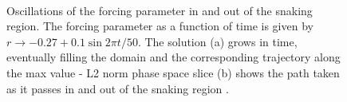 \documentclass[pre,preprint,superscriptaddress]{revtex4-1}
\begin{document}
\begin{figure}[h]
  \begin{center}
    \mbox{
       \quad
      }
    \caption{Oscillations of the forcing parameter in and out of the snaking region.  The forcing parameter as a function of time is given by $r\rightarrow -0.27+ 0.1\sin2\pi t/50$.  The solution (a) grows in time, eventually filling the domain and the corresponding trajectory along the max value - L2 norm phase space slice (b) shows the path taken as it passes in and out of the snaking region . }
    \label{fig:FillDomain}
  \end{center}
\end{figure} 


\end{document}
